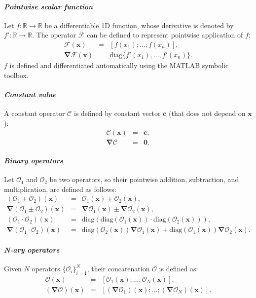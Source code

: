 \documentclass[10pt]{ijnam}
\newcommand{\diag}{\ensuremath{\mathrm{diag}}}
\newcommand{\R}{\ensuremath{\mathbb{R}}}
\newcommand\bnabla{\boldsymbol{\nabla}}
\newcommand\bx{\boldsymbol{x}}
\newcommand\bc{\boldsymbol{c}}
\newcommand\bzero{\boldsymbol{0}}
\newcommand\cF{\mathcal{F}}
\newcommand\cO{\mathcal{O}}
\begin{document}
\paragraph{\textit{Pointwise scalar function}}
Let $f: \R \rightarrow \R$ be a differentiable 1D function, whose derivative is
denoted by $f': \R \rightarrow \R$. The operator $\cF$ can be defined to
represent pointwise application of $f$:
\begin{eqnarray*}
\cF(\bx) &=& [f(x_1); \ldots; f(x_n)], \\
\bnabla\cF(\bx) &=& \diag\{f'(x_1), \ldots, f'(x_n)\}.
\end{eqnarray*}
$f$ is defined and differentiated automatically using the MATLAB symbolic toolbox.

\paragraph{\textit{Constant value}}
A constant operator $\mathcal{C}$ is defined by constant vector $\bc$ 
(that does not depend on $\bx$):
\begin{eqnarray*}
\mathcal{C}(\bx) &=& \bc, \\
\bnabla\mathcal{C} &=& \bzero.
\end{eqnarray*}

\paragraph{\textit{Binary operators}}
Let $\cO_1$ and $\cO_2$ be two operators, so their pointwise addition, subtraction,
and multiplication, are defined as follows:
\begin{eqnarray*}
(\cO_1 \pm \cO_2)(\bx) &=& \cO_1(\bx) \pm \cO_2(\bx), \\
\bnabla (\cO_1 \pm \cO_2)(\bx)   &=& \bnabla\cO_1(\bx) \pm \bnabla\cO_2(\bx), \\
(\cO_1 \cdot \cO_2)(\bx) &=& \diag(\diag(\cO_1(\bx)) \cdot \diag(\cO_2(\bx))), \\
\bnabla (\cO_1 \cdot \cO_2)(\bx) &=& \diag(\cO_2(\bx)) \bnabla\cO_1(\bx) 
                                  + \diag(\cO_1(\bx)) \bnabla\cO_2(\bx).
\end{eqnarray*}

\paragraph{\textit{N-ary operators}}
Given $N$ operators $\{\cO_i\}_{i=1}^N$, their concatenation $\cO$ is defined as:
\begin{eqnarray*}
\cO(\bx) &=& [\cO_1(\bx); \ldots; \cO_N(\bx)], \\
(\bnabla\cO)(\bx) &=& [(\bnabla\cO_1)(\bx); \ldots; (\bnabla\cO_N)(\bx)].
\end{eqnarray*}
\end{document}
